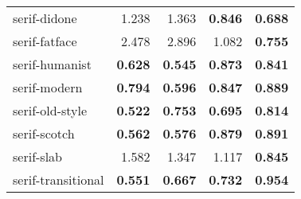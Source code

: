 \begin{longtable}{|l|r|r|r|r|}
serif-didone              & 1.238          & 1.363          & \textbf{0.846} & \textbf{0.688} \\
serif-fatface             & 2.478          & 2.896          & 1.082          & \textbf{0.755} \\
serif-humanist            & \textbf{0.628} & \textbf{0.545} & \textbf{0.873} & \textbf{0.841} \\
serif-modern              & \textbf{0.794} & \textbf{0.596} & \textbf{0.847} & \textbf{0.889} \\
serif-old-style           & \textbf{0.522} & \textbf{0.753} & \textbf{0.695} & \textbf{0.814} \\
serif-scotch              & \textbf{0.562} & \textbf{0.576} & \textbf{0.879} & \textbf{0.891} \\
serif-slab                & 1.582          & 1.347          & 1.117          & \textbf{0.845} \\
serif-transitional        & \textbf{0.551} & \textbf{0.667} & \textbf{0.732} & \textbf{0.954}

\end{longtable}


